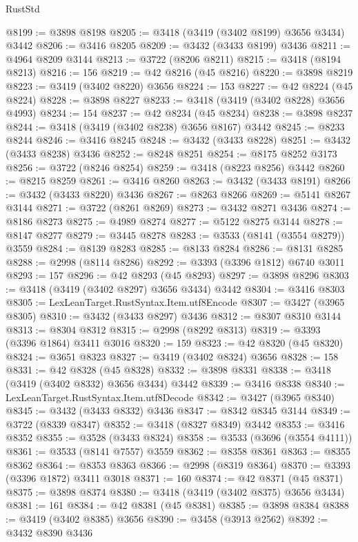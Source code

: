 \begin{lexlean}{RustStd}
\begin{coremodule}
@8199 := @3898 @8198
@8205 := @3418 (@3419 (@3402 @8199) @3656 @3434) @3442
@8206 := @3416 @8205
@8209 := @3432 (@3433 @8199) @3436
@8211 := @4964 @8209 @3144
@8213 := @3722 (@8206 @8211)
@8215 := @3418 (@8194 @8213)
@8216 := 156
@8219 := @42 @8216 (@45 @8216)
@8220 := @3898 @8219
@8223 := @3419 (@3402 @8220) @3656
@8224 := 153
@8227 := @42 @8224 (@45 @8224)
@8228 := @3898 @8227
@8233 := @3418 (@3419 (@3402 @8228) @3656 @4993)
@8234 := 154
@8237 := @42 @8234 (@45 @8234)
@8238 := @3898 @8237
@8244 := @3418 (@3419 (@3402 @8238) @3656 @8167) @3442
@8245 := @8233 @8244
@8246 := @3416 @8245
@8248 := @3432 (@3433 @8228)
@8251 := @3432 (@3433 @8238) @3436
@8252 := @8248 @8251
@8254 := @8175 @8252 @3173
@8256 := @3722 (@8246 @8254)
@8259 := @3418 (@8223 @8256) @3442
@8260 := @8215 @8259
@8261 := @3416 @8260
@8263 := @3432 (@3433 @8191)
@8266 := @3432 (@3433 @8220) @3436
@8267 := @8263 @8266
@8269 := @5141 @8267 @3144
@8271 := @3722 (@8261 @8269)
@8273 := @3432 @8271 @3436
@8274 := @8186 @8273
@8275 := @4989 @8274
@8277 := @5122 @8275 @3144
@8278 := @8147 @8277
@8279 := @3445 @8278
@8283 := @3533 (@8141 (@3554 @8279)) @3559
@8284 := @8139 @8283
@8285 := @8133 @8284
@8286 := @8131 @8285
@8288 := @2998 (@8114 @8286)
@8292 := @3393 (@3396 @1812) @6740 @3011
@8293 := 157
@8296 := @42 @8293 (@45 @8293)
@8297 := @3898 @8296
@8303 := @3418 (@3419 (@3402 @8297) @3656 @3434) @3442
@8304 := @3416 @8303
@8305 := LexLeanTarget.RustSyntax.Item.utf8Encode
@8307 := @3427 (@3965 @8305)
@8310 := @3432 (@3433 @8297) @3436
@8312 := @8307 @8310 @3144
@8313 := @8304 @8312
@8315 := @2998 (@8292 @8313)
@8319 := @3393 (@3396 @1864) @3411 @3016
@8320 := 159
@8323 := @42 @8320 (@45 @8320)
@8324 := @3651 @8323
@8327 := @3419 (@3402 @8324) @3656
@8328 := 158
@8331 := @42 @8328 (@45 @8328)
@8332 := @3898 @8331
@8338 := @3418 (@3419 (@3402 @8332) @3656 @3434) @3442
@8339 := @3416 @8338
@8340 := LexLeanTarget.RustSyntax.Item.utf8Decode
@8342 := @3427 (@3965 @8340)
@8345 := @3432 (@3433 @8332) @3436
@8347 := @8342 @8345 @3144
@8349 := @3722 (@8339 @8347)
@8352 := @3418 (@8327 @8349) @3442
@8353 := @3416 @8352
@8355 := @3528 (@3433 @8324)
@8358 := @3533 (@3696 (@3554 @4111))
@8361 := @3533 (@8141 @7557) @3559
@8362 := @8358 @8361
@8363 := @8355 @8362
@8364 := @8353 @8363
@8366 := @2998 (@8319 @8364)
@8370 := @3393 (@3396 @1872) @3411 @3018
@8371 := 160
@8374 := @42 @8371 (@45 @8371)
@8375 := @3898 @8374
@8380 := @3418 (@3419 (@3402 @8375) @3656 @3434)
@8381 := 161
@8384 := @42 @8381 (@45 @8381)
@8385 := @3898 @8384
@8388 := @3419 (@3402 @8385) @3656
@8390 := @3458 (@3913 @2562)
@8392 := @3432 @8390 @3436

\end{coremodule}
\end{lexlean}
